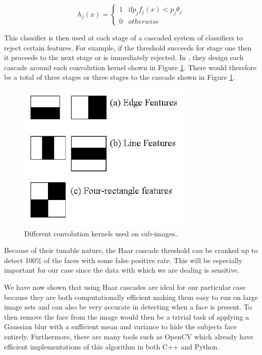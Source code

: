\documentclass[
	submission,
	final,
	notitlepage,
	narroweqnarray,
	inline,
	twoside,
	]{ieee}
\begin{document}
\begin{equation}
   h_j(x) = \begin{cases}
     1  & \text{if} p_jf_j(x) < p_j \theta_j \\
     0 & otherwise
        \end{cases}
\end{equation}

This classifier is then used at each stage of a cascaded system of classifiers
to reject certain features. For example, if the threshold succeeds for stage one
then it proceeds to the next stage or is immediately rejected. In \cite{haar_cascades},
they design each cascade around each convolution kernel shown in Figure
\ref{fig:haar_cascades}. There would therefore be a total of three stages
or three stages to the cascade shown in Figure \ref{fig:haar_cascades}.

\begin{figure}[h]
\centering
\includegraphics[width=\linewidth]{figures/haar_features}
\caption{Different convolution kernels used on sub-images..}
\label{fig:haar_cascades}
\end{figure}

Because of their tunable nature, the Haar cascade threshold
can be cranked up to detect 100\% of the faces with some false
positive rate. This will be especially important for our case
since the data with which we are dealing is sensitive.

We have now shown that using Haar cascades are ideal for our
particular case because they are both computationally efficient
making them easy to run on large image sets and can also be
very accurate in detecting when a face is present. To then remove the face
from the image would then be a trivial task of applying a Gaussian
blur with a sufficient mean and variance to hide the subjects face
entirely. Furthermore,
there are many tools such as OpenCV \cite{opencv} which already have
efficient implementations of this algorithm in both C++ and Python.
\end{document}
